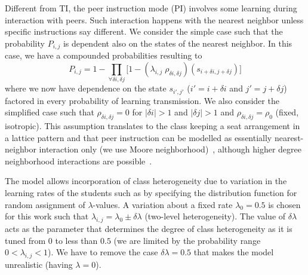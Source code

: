 \documentclass[twocolumn,secnumarabic,amssymb, nobibnotes, aps, prd]{revtex4-2}
\begin{document}

    Different from TI, the peer instruction mode (PI) involves some learning during interaction with peers.
    Such interaction happens with the nearest neighbor unless specific instructions say different.
    We consider the simple case such that the probability $P_{i,j}$ is dependent also on the states of the nearest neighbor.
    In this case, we have a compounded probabilities resulting to
    \begin{equation} 
        \label{eq:BPCA PI learning probability}
            P_{i,j} = 1 - \prod_{\forall \delta i, \delta j}{\lbrack
                1-(\lambda_{i,j}\;\rho_{\delta i, \delta j})(s_{i+\delta i, j+\delta j})}
            \rbrack
    \end{equation}
    where we now have dependence on the state
    $s_{i',j'}$ ($i'=i+\delta i$ and $j'=j+\delta j$) factored in every probability of learning transmission.
    We also consider the simplified case such that $\rho_{\delta i, \delta j} = 0$ 
    for $|\delta i| > 1$ and $|\delta j| > 1$ and $\rho_{\delta i,\delta j}=\rho_0$ (fixed, isotropic).
    This assumption translates to the class keeping a seat arrangement in a lattice pattern and that peer instruction can be modelled as essentially nearest-neighbor interaction only (we use Moore neighborhood)~\cite{kari2005catheory, zaitsev2017generalized,louis2018probabilistic}, although higher degree neighborhood interactions are possible~\cite{dong2021influence}.

    The model allows incorporation of class heterogeneity due to variation in the learning rates of the students such as by specifying the distribution function for random assignment of $\lambda$-values.
    A variation about a fixed rate $\lambda_0=0.5$ is chosen for this work such that $\lambda_{i,j}=\lambda_0 \pm \delta\!\lambda$ (two-level heterogeneity).
    The value of $\delta\!\lambda$ acts as the parameter that determines the degree of class heterogeneity as it is tuned from $0$ to less than $0.5$ (we are limited by the probability range ${0}<\lambda_{i,j}<{1}$).
    We have to remove the case $\delta\!\lambda=0.5$ that makes the model unrealistic (having $\lambda=0$).
\end{document}
